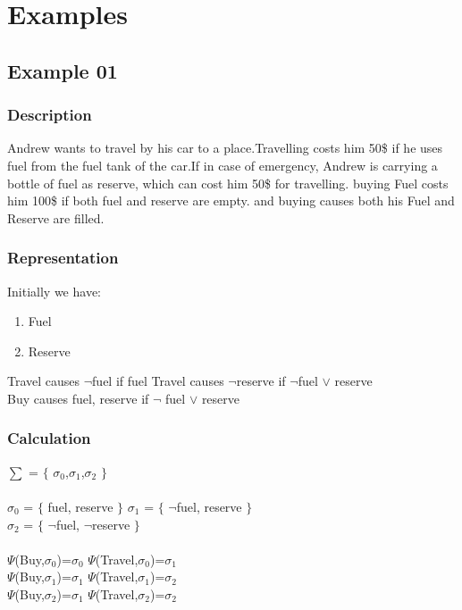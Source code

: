 \documentclass[11pt]{article}
\begin{document}
	\section{Examples}\label{sec:Examples}
	\subsection{Example 01}\label{example:ex01}
	\subsubsection{Description}\label{par:p101}
	Andrew wants to travel by his car to a place.Travelling costs him 50\$ if he uses fuel from the fuel tank of the car.If in case of emergency, Andrew is carrying a bottle of fuel as reserve, which can cost him 50\$ for travelling. buying Fuel costs him 100\$ if both fuel and reserve are empty. and buying causes both his Fuel and Reserve are filled. 
	\subsubsection{Representation}\label{par:p201}
	Initially we have:
	\begin{enumerate}
		\item Fuel
		\item Reserve
	\end{enumerate}
	Travel causes $\neg$fuel if fuel %
	Travel causes $\neg$reserve if $\neg$fuel $\vee$ reserve\\
	Buy causes fuel, reserve  if $\neg$ fuel $\vee$ reserve\\
	\subsubsection{Calculation}\label{par:p301}\par
	$\sum$ = $\lbrace$ $\sigma_{0}$,$\sigma_{1}$,$\sigma_{2}$ $\rbrace$\\ \\
	$\sigma_{0}$ = $\lbrace$ fuel, reserve $\rbrace$ \indent $\sigma_{1}$ = $\lbrace$ $\neg$fuel, reserve $\rbrace$\\
	$\sigma_{2}$ = $\lbrace$ $\neg$fuel, $\neg$reserve $\rbrace$ 
	\\ \\
	$\Psi$(Buy,$\sigma_{0}$)=$\sigma_{0}$ \indent $\Psi$(Travel,$\sigma_{0}$)=$\sigma_{1}$\\
	$\Psi$(Buy,$\sigma_{1}$)=$\sigma_{1}$ \indent $\Psi$(Travel,$\sigma_{1}$)=$\sigma_{2}$\\
	$\Psi$(Buy,$\sigma_{2}$)=$\sigma_{1}$ \indent $\Psi$(Travel,$\sigma_{2}$)=$\sigma_{2}$\\
\end{document}
